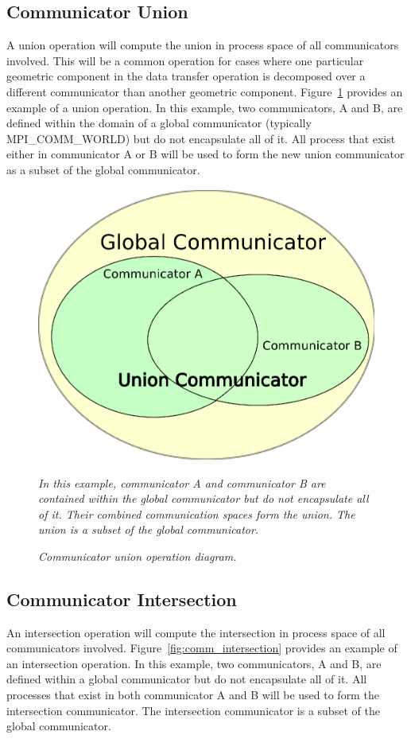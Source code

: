 \documentclass[letterpaper,12pt]{article}
\begin{document}
\subsection{Communicator Union}\label{subsec:comm_union}
A union operation will compute the union in process space of all
communicators involved. This will be a common operation for cases
where one particular geometric component in the data transfer
operation is decomposed over a different communicator than another
geometric component. Figure~\ref{fig:comm_union} provides an example
of a union operation. In this example, two communicators, A and B, are
defined within the domain of a global communicator (typically
MPI\_COMM\_WORLD) but do not encapsulate all of it. All process that
exist either in communicator A or B will be used to form the new union
communicator as a subset of the global communicator.

\begin{figure}[htpb!]
  \centering
  \includegraphics[width=5in]{union_comm.eps}
  \caption{\sl Communicator union operation diagram.}{\sl In this
    example, communicator A and communicator B are contained within
    the global communicator but do not encapsulate all of it. Their
    combined communication spaces form the union. The union is a
    subset of the global communicator.}
  \label{fig:comm_union}
\end{figure}

\subsection{Communicator Intersection}\label{subsec:comm_intersection}
An intersection operation will compute the intersection in process
space of all communicators
involved. Figure~\ref{fig:comm_intersection} provides an example of an
intersection operation. In this example, two communicators, A and B,
are defined within a global communicator but do not encapsulate all of
it. All processes that exist in both communicator A and B will be used
to form the intersection communicator. The intersection communicator
is a subset of the global communicator.
\end{document}
